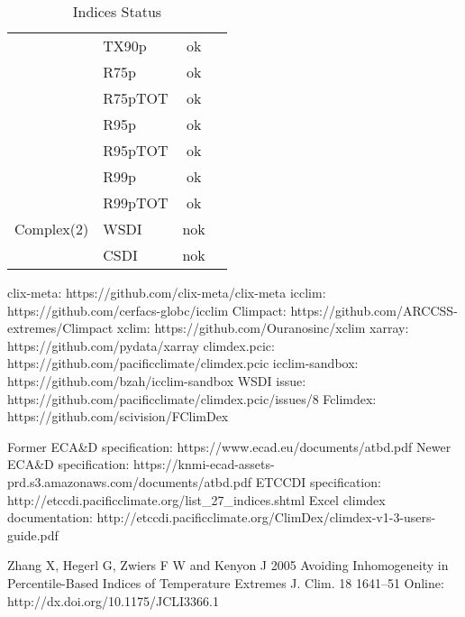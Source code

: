 \documentclass[a4paper,11pt]{article}
\begin{document}
\begin{table}[h]
\begin{tabular}{l l c c}
                     &  TX90p    &   ok             &                       \\
                     &  R75p     &   ok             &                       \\
                     &  R75pTOT  &   ok             &                       \\
                     &  R95p     &   ok             &                       \\
                     &  R95pTOT  &   ok             &                       \\
                     &  R99p     &   ok             &                       \\
                     &  R99pTOT  &   ok             &                       \\
        Complex(2)   &  WSDI     &   nok            &                       \\
                     &  CSDI     &   nok            &                       \\
    \end{tabular}
    \label{table/indices_status}
    \caption{Indices Status}
    \end{table}

\clearpage
\begin{thebibliography}{1}
        clix-meta: https://github.com/clix-meta/clix-meta
        icclim: https://github.com/cerfacs-globc/icclim
        Climpact: https://github.com/ARCCSS-extremes/Climpact
        xclim: https://github.com/Ouranosinc/xclim
        xarray: https://github.com/pydata/xarray
        climdex.pcic: https://github.com/pacificclimate/climdex.pcic    
        icclim-sandbox: https://github.com/bzah/icclim-sandbox
        WSDI issue: https://github.com/pacificclimate/climdex.pcic/issues/8
        Fclimdex: https://github.com/scivision/FClimDex
        
        Former ECA\&D specification: https://www.ecad.eu/documents/atbd.pdf
        Newer ECA\&D specification: https://knmi-ecad-assets-prd.s3.amazonaws.com/documents/atbd.pdf
        ETCCDI specification: http://etccdi.pacificclimate.org/list\_27\_indices.shtml
        Excel climdex documentation: http://etccdi.pacificclimate.org/ClimDex/climdex-v1-3-users-guide.pdf

        Zhang X, Hegerl G, Zwiers F W and Kenyon J 2005 Avoiding Inhomogeneity in Percentile-Based Indices of Temperature Extremes J. Clim. 18 1641–51 Online: http://dx.doi.org/10.1175/JCLI3366.1
\end{thebibliography}
\end{document}
